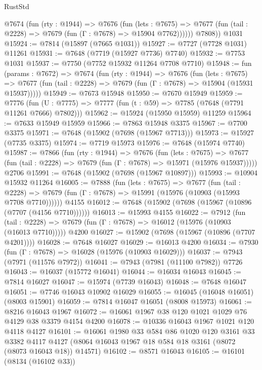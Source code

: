 \begin{lexlean}{RustStd}
\begin{coremodule}
          @7674
            (fun (rty : @1944) =>
            @7676
              (fun (lets : @7675) =>
              @7677 (fun (tail : @2228) => @7679 (fun (Γ : @7678) => @15904 @7762))))))
        @7808))
    @1031
@15924 := @7814 (@15897 (@7665 @1031))
@15927 := @7727 (@7728 @1031) @11261
@15931 := @7648 (@7719 (@15927 @7736) @7740)
@15932 := @7753 @1031
@15937 := @7750 (@7752 @15932 @11264 @7708 @7710)
@15948 := fun (params : @7672) =>
  @7674
    (fun (rty : @1944) =>
    @7676
      (fun (lets : @7675) =>
      @7677 (fun (tail : @2228) => @7679 (fun (Γ : @7678) => @15904 (@15931 @15937)))))
@15949 := @7673 @15948
@15950 := @7670 @15949
@15959 := @7776
    (fun (U : @7775) => @7777 (fun (t : @59) => @7785 (@7648 (@7791 @11261 @7666) @7802)))
@15962 := @15924 (@15950 @15959) @11259
@15964 := @7633 @15949 @15959
@15966 := @7863 @15948 @3375
@15967 := @7700 @3375
@15971 := @7648 (@15902 (@7698 (@15967 @7713)))
@15973 := @15927 (@7735 @3375)
@15974 := @7719 @15973
@15976 := @7648 (@15974 @7740)
@15987 := @7866
    (fun (rty : @1944) =>
    @7676
      (fun (lets : @7675) =>
      @7677 (fun (tail : @2228) => @7679 (fun (Γ : @7678) => @15971 (@15976 @15937)))))
    @2706
@15991 := @7648 (@15902 (@7698 (@15967 @10897)))
@15993 := @10904 @15932 @11264
@16005 := @7888
    (fun (lets : @7675) =>
    @7677
      (fun (tail : @2228) =>
      @7679 (fun (Γ : @7678) => @15991 (@15976 (@10903 (@15993 @7708 @7710))))))
    @4155
@16012 := @7648 (@15902 (@7698 (@15967 (@10896 (@7707 (@4156 @7710))))))
@16013 := @15993 @4155
@16022 := @7912
    (fun (tail : @2228) => @7679 (fun (Γ : @7678) => @16012 (@15976 (@10903 (@16013 @7710)))))
    @4200
@16027 := @15902 (@7698 (@15967 (@10896 (@7707 @4201))))
@16028 := @7648 @16027
@16029 := @16013 @4200
@16034 := @7930 (fun (Γ : @7678) => @16028 (@15976 (@10903 @16029)))
@16037 := @7943 (@7971 (@11576 @7972))
@16041 := @7943 (@7981 (@11100 @7982)) @7726
@16043 := @16037 (@15772 @16041)
@16044 := @16034 @16043
@16045 := @7814 @16027
@16047 := @15974 (@7739 @16043)
@16048 := @7648 @16047
@16051 := @7746 @16043 @10902 @16029
@16055 := @16045 (@16048 @16051) (@8003 @15901)
@16059 := @7814 @16047 @16051 (@8008 @15973)
@16061 := @8216 @16043 @1967
@16072 := @16061 @1967 @38 @120 @1021 @1029 @76 @4129 @38 @3379 @4154 @4200
@16078 := @10336 @16043 @1967 @1021 @120 @4118 @4127
@16101 := @16061
    @1980
    @33
    @584
    @86
    @1020
    @120
    @3161
    @33
    @3382
    @4117
    @4127
    (@8064 @16043 @1967 @18 @584 @18 @3161 (@8072 (@8073 @16043 @18)) @14571)
@16102 := @8571 @16043
@16105 := @16101 (@8134 (@16102 @33))

\end{coremodule}
\end{lexlean}
